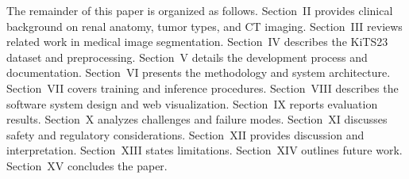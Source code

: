 The remainder of this paper is organized as follows. Section~II provides clinical background on renal anatomy, tumor types, and CT imaging. Section~III reviews related work in medical image segmentation. Section~IV describes the KiTS23 dataset and preprocessing. Section~V details the development process and documentation. Section~VI presents the methodology and system architecture. Section~VII covers training and inference procedures. Section~VIII describes the software system design and web visualization. Section~IX reports evaluation results. Section~X analyzes challenges and failure modes. Section~XI discusses safety and regulatory considerations. Section~XII provides discussion and interpretation. Section~XIII states limitations. Section~XIV outlines future work. Section~XV concludes the paper.
